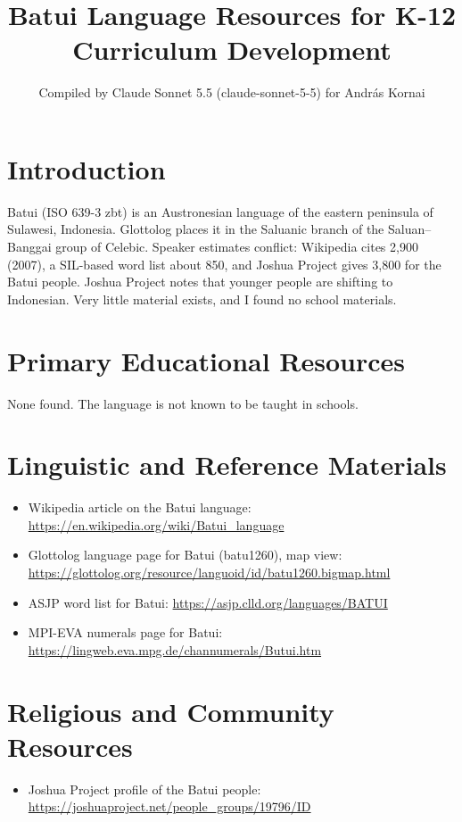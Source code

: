 \documentclass[12pt]{article}
\title{Batui Language Resources for K-12 Curriculum Development}
\author{Compiled by Claude Sonnet 5.5 (claude-sonnet-5-5) for Andr\'as Kornai}
\date{}
\begin{document}
\maketitle

\section{Introduction}
Batui (ISO 639-3 zbt) is an Austronesian language of the eastern peninsula of Sulawesi, Indonesia. Glottolog places it in the Saluanic branch of the Saluan--Banggai group of Celebic. Speaker estimates conflict: Wikipedia cites 2,900 (2007), a SIL-based word list about 850, and Joshua Project gives 3,800 for the Batui people. Joshua Project notes that younger people are shifting to Indonesian. Very little material exists, and I found no school materials.

\section{Primary Educational Resources}
None found. The language is not known to be taught in schools.

\section{Linguistic and Reference Materials}
\begin{itemize}
\item Wikipedia article on the Batui language: \url{https://en.wikipedia.org/wiki/Batui_language}
\item Glottolog language page for Batui (batu1260), map view: \url{https://glottolog.org/resource/languoid/id/batu1260.bigmap.html}
\item ASJP word list for Batui: \url{https://asjp.clld.org/languages/BATUI}
\item MPI-EVA numerals page for Batui: \url{https://lingweb.eva.mpg.de/channumerals/Butui.htm}
\end{itemize}

\section{Religious and Community Resources}
\begin{itemize}
\item Joshua Project profile of the Batui people: \url{https://joshuaproject.net/people_groups/19796/ID}
\end{itemize}
\end{document}
